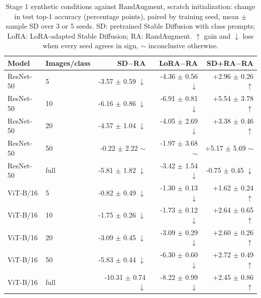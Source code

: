 \begin{table}[H]
\centering
\caption{Stage 1 synthetic conditions against RandAugment, scratch initialization: change in test top-1 accuracy (percentage points), paired by training seed, mean $\pm$ sample SD over 3 or 5 seeds. SD: pretrained Stable Diffusion with class prompts; LoRA: LoRA-adapted Stable Diffusion; RA: RandAugment. $\uparrow$ gain and $\downarrow$ loss when every seed agrees in sign, $\sim$ inconclusive otherwise.}
\label{tab:stage1-scratch-accuracy-vs-randaugment-test}
\begin{tabular}{llrrr}
\toprule
Model & Images/class & SD$-$RA & LoRA$-$RA & SD+RA$-$RA \\
\midrule
ResNet-50 & 5 & -3.57 $\pm$ 0.59 $\downarrow$ & -4.36 $\pm$ 0.56 $\downarrow$ & +2.96 $\pm$ 0.26 $\uparrow$ \\
ResNet-50 & 10 & -6.16 $\pm$ 0.86 $\downarrow$ & -6.91 $\pm$ 0.81 $\downarrow$ & +5.54 $\pm$ 3.78 $\uparrow$ \\
ResNet-50 & 20 & -4.57 $\pm$ 1.04 $\downarrow$ & -4.05 $\pm$ 2.69 $\downarrow$ & +3.38 $\pm$ 0.46 $\uparrow$ \\
ResNet-50 & 50 & -0.22 $\pm$ 2.22 $\sim$ & -1.97 $\pm$ 3.68 $\sim$ & +5.17 $\pm$ 5.69 $\sim$ \\
ResNet-50 & full & -5.81 $\pm$ 1.82 $\downarrow$ & -3.42 $\pm$ 1.54 $\downarrow$ & -0.75 $\pm$ 0.45 $\downarrow$ \\
\midrule
ViT-B/16 & 5 & -0.82 $\pm$ 0.49 $\downarrow$ & -1.30 $\pm$ 0.13 $\downarrow$ & +1.62 $\pm$ 0.24 $\uparrow$ \\
ViT-B/16 & 10 & -1.75 $\pm$ 0.26 $\downarrow$ & -1.73 $\pm$ 0.12 $\downarrow$ & +2.64 $\pm$ 0.65 $\uparrow$ \\
ViT-B/16 & 20 & -3.09 $\pm$ 0.45 $\downarrow$ & -3.09 $\pm$ 0.29 $\downarrow$ & +2.60 $\pm$ 0.26 $\uparrow$ \\
ViT-B/16 & 50 & -5.83 $\pm$ 0.44 $\downarrow$ & -6.30 $\pm$ 0.60 $\downarrow$ & +2.72 $\pm$ 0.49 $\uparrow$ \\
ViT-B/16 & full & -10.31 $\pm$ 0.74 $\downarrow$ & -8.22 $\pm$ 0.99 $\downarrow$ & +2.45 $\pm$ 0.86 $\uparrow$ \\
\bottomrule
\end{tabular}
\end{table}
